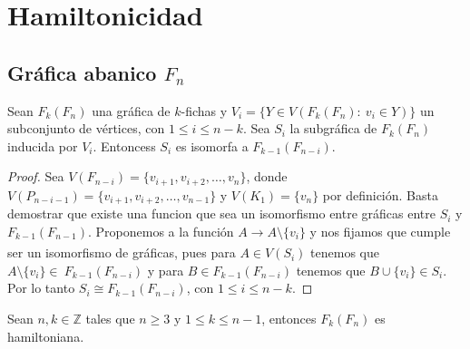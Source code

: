 \chapter{Hamiltonicidad}%
\label{cap:hamilt}

\section{Gr\'afica abanico $F_n$}%
\label{sec:SimpleFan}

\begin{proposicion}
        \label{prop:iso-SFan}
            Sean $F_k(F_n)$ una gr\'afica de $k$-fichas y $V_i=\{ Y \in
            V(F_k(F_n) \colon\ v_i \in Y) \}$ un subconjunto de v\'ertices, con
            $1 \leq i \leq n-k$. Sea $S_i$ la subgr\'afica de $F_k(F_n)$
            inducida  por $V_i$. Entoncess $S_i$ es isomorfa a
            $F_{k-1}(F_{n-i})$.
        \end{proposicion}
    
        \begin{proof}
            Sea $V(F_{n-i}) = \{v_{i+1}, v_{i+2}, \dots, v_n\}$, donde
            $V(P_{n-i-1}) = \{v_{i+1}, v_{i+2}, \dots, v_{n-1}\}$ y $V(K_1)=
            \{v_n\}$ por definici\'on. Basta demostrar que existe una funcion
            que sea un isomorfismo entre gr\'aficas entre $S_i$ y
            $F_{k-1}(F_{n-1})$. Proponemos a la funci\'on $A \xrightarrow[]{} A
            \setminus \{v_i\}$ y nos fijamos que cumple ser un isomorfismo de
            gr\'aficas, pues para $A \in V(S_i)$ tenemos que $A \setminus
            \{v_i\} \in \ F_{k-1}(F_{n-i})$  y para $B \in F_{k-1}(F_{n-i})$
            tenemos que $B \cup \{v_i\} \in S_i$. Por lo tanto $S_i \cong
            F_{k-1}(F_{n-i})$, con $1 \leq i \leq n-k$.
        \end{proof}
    
        \begin{teorema}
        \label{teo:hamilt-SFan}
            Sean $n,k \in \mathbb{Z}$ tales que $n \geq 3$ y $1 \leq k \leq n-1$,
            entonces $F_k(F_n)$ es hamiltoniana.
        \end{teorema}
    
